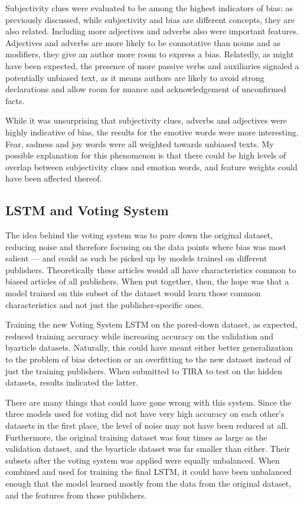 \documentclass[11pt, a4paper]{article}
\begin{document}
Subjectivity clues were evaluated to be among the highest indicators of bias: as previously discussed, while subjectivity and bias are different concepts, they are also related. Including more adjectives and adverbs also were important features. Adjectives and adverbs are more likely to be connotative than nouns and as modifiers, they give an author more room to express a bias. Relatedly, as might have been expected, the presence of more passive verbs and auxiliaries signaled a potentially unbiased text, as it means authors are likely to avoid strong declarations and allow room for nuance and acknowledgement of unconfirmed facts.

While it was unsurprising that subjectivity clues, adverbs and adjectives were highly indicative of bias, the results for the emotive words were more interesting. Fear, sadness and joy words were all weighted towards unbiased texts. My possible explanation for this phenomenon is that there could be high levels of overlap between subjectivity clues and emotion words, and feature weights could have been affected thereof.

\subsection{LSTM and Voting System}

The idea behind the voting system was to pare down the original dataset, reducing noise and therefore focusing on the data points where bias was most salient --- and could as such be picked up by models trained on different publishers. Theoretically these articles would all have characteristics common to biased articles of all publishers. When put together, then, the hope was that a model trained on this subset of the dataset would learn those common characteristics and not just the publisher-specific ones.

Training the new Voting System LSTM on the pared-down dataset, as expected, reduced training accuracy while increasing accuracy on the validation and byarticle datasets. Naturally, this could have meant either better generalization to the problem of bias detection or an overfitting to the new dataset instead of just the training publishers. When submitted to TIRA to test on the hidden datasets, results indicated the latter.

There are many things that could have gone wrong with this system. Since the three models used for voting did not have very high accuracy on each other's datasets in the first place, the level of noise may not have been reduced at all. Furthermore, the original training dataset was four times as large as the validation dataset, and the byarticle dataset was far smaller than either. Their subsets after the voting system was applied were equally unbalanced. When combined and used for training the final LSTM, it could have been unbalanced enough that the model learned mostly from the data from the original dataset, and the features from those publishers.
\end{document}
